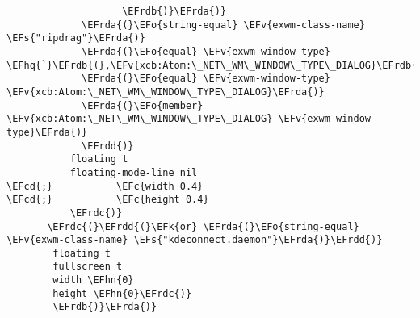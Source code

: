 \documentclass[a4wide,10pt]{article}
\newcommand{\EFc}[1]{\textcolor{EFc}{#1}} %
\newcommand{\EFcd}[1]{\textcolor{EFcd}{#1}} %
\newcommand{\EFs}[1]{\textcolor{EFs}{#1}} %
\newcommand{\EFk}[1]{\textcolor{EFk}{#1}} %
\newcommand{\EFv}[1]{\textcolor{EFv}{#1}} %
\newcommand{\EFo}[1]{\textcolor{EFo}{#1}} %
\newcommand{\EFhn}[1]{\textcolor{EFhn}{\textbf{#1}}} %
\newcommand{\EFhq}[1]{\textcolor{EFhq}{#1}} %
\newcommand{\EFrda}[1]{\textcolor{EFrda}{#1}} %
\newcommand{\EFrdb}[1]{\textcolor{EFrdb}{#1}} %
\newcommand{\EFrdc}[1]{\textcolor{EFrdc}{#1}} %
\newcommand{\EFrdd}[1]{\textcolor{EFrdd}{#1}} %
\begin{document}
\begin{Code}
\begin{Verbatim}
                    \EFrdb{)}\EFrda{)}
             \EFrda{(}\EFo{string-equal} \EFv{exwm-class-name} \EFs{"ripdrag"}\EFrda{)}
             \EFrda{(}\EFo{equal} \EFv{exwm-window-type} \EFhq{`}\EFrdb{(},\EFv{xcb:Atom:\_NET\_WM\_WINDOW\_TYPE\_DIALOG}\EFrdb{)}\EFrda{)}
             \EFrda{(}\EFo{equal} \EFv{exwm-window-type} \EFv{xcb:Atom:\_NET\_WM\_WINDOW\_TYPE\_DIALOG}\EFrda{)}
             \EFrda{(}\EFo{member} \EFv{xcb:Atom:\_NET\_WM\_WINDOW\_TYPE\_DIALOG} \EFv{exwm-window-type}\EFrda{)}
             \EFrdd{)}
           floating t
           floating-mode-line nil
\EFcd{;}           \EFc{width 0.4}
\EFcd{;}           \EFc{height 0.4}
           \EFrdc{)}
       \EFrdc{(}\EFrdd{(}\EFk{or} \EFrda{(}\EFo{string-equal} \EFv{exwm-class-name} \EFs{"kdeconnect.daemon"}\EFrda{)}\EFrdd{)}
        floating t
        fullscreen t
        width \EFhn{0}
        height \EFhn{0}\EFrdc{)}
        \EFrdb{)}\EFrda{)}


\end{Verbatim}
\end{Code}
\end{document}
